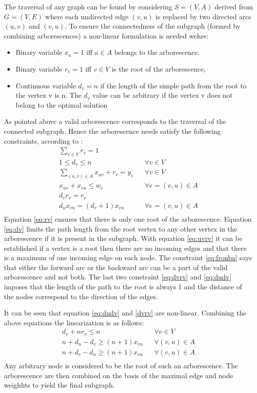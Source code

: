 \documentclass[msthesis.tex]{subfiles}
\begin{document}
The traversal of any graph can be found by considering $S = (V,A)$ derived from $G=(V,E)$  where each undirected edge $(v,u)$ is replaced by two directed arcs $(u,v)$ and $(v,u)$. To ensure the connectedness of the subgraph (formed by combining arborescences) a non-linear formulation is needed wehre:
\begin{itemize}
    \item Binary variable $x_a = 1$ iff $a \in A$ belongs to the arborescence.
    \item Binary variable $r_v = 1$ iff $v \in V$ is the root of the arborescence,
    \item Continuous variable $d_v = n$ if the length of the simple path from the root to the vertex v is n. The $d_v$ value can be arbitrary if the vertex v does not belong to the optimal solution
\end{itemize}
As pointed above a valid arborescence corresponds to the traversal of the connected subgraph. Hence the arborescence needs satisfy the following constraints, according to \cite{haouari2013enhanced}:
\begin{align}
    \label{eq:rv}
    \sum_{v \in V} r_v = 1\\
    \label{eq:dv}
    1 \leq d_v \leq n && \forall v \in V \\
    \label{eq:uvrv}
    \sum_{(u,v) \in A} x_{uv} + r_v = y_v && \forall v \in V\\
    \label{eq:fronba}
    x_{uv} + x_{vu} \leq w_e && \forall e =(v,u) \in A\\
    \label{eq:dvrv}
    d_v r_v = r_v\\
    \label{eq:dudv}
    d_u x_{vu} = (d_v + 1) x_{vu} && \forall e=(v, u) \in A\\
\end{align}
Equation \ref{eq:rv} ensures that there is only one root of the arborescence. Equation \ref{eq:dv} limits the path length from the root vertex to any other vertex in the arborescence if it is present in the subgraph. With equation \ref{eq:uvrv} it can be established if a vertex is a root then there are no incoming edges and that there is a maximum of one incoming edge on each node. The constraint \ref{eq:fronba} says that either the forward arc or the backward arc can be a part of the valid arborescence and not both. The last two constraint \ref{eq:dvrv}  and \ref{eq:dudv} imposes that the length of the path to the root is always 1 and the distance of the nodes correspond to the direction of the edges.

It can be seen that equation \ref{eq:dudv} and \ref{dvrv} are non-linear. Combining the above equations the linearization is as follows:
\begin{align}
    d_v + n r_v \leq n && \forall v \in V\\
    n + d_u - d_v \geq (n+1) x_{vu} && \forall (v,u) \in A\\
    n + d_v - d_u \geq (n+1) x_{vu} && \forall (v,u) \in A\\
\end{align}
Any arbitrary node is considered to be the root of such an arborescence. The arborescence are then combined on the basis of the maximal edge and node weighhts to yield the final subgraph. 
\end{document}
